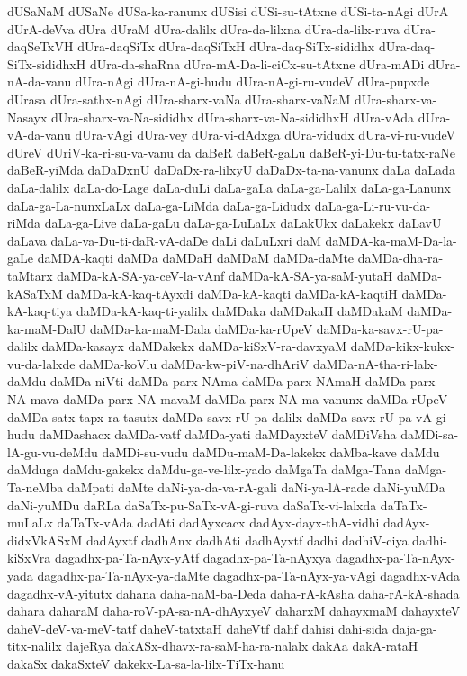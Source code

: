 {dUSaNaM
dUSaNe
dUSa-ka-ranunx
dUSisi
dUSi-su-tAtxne
dUSi-ta-nAgi
dUrA
dUrA-deVva
dUra
dUraM
dUra-dalilx
dUra-da-lilxna
dUra-da-lilx-ruva
dUra-daqSeTxVH
dUra-daqSiTx
dUra-daqSiTxH
dUra-daq-SiTx-sididhx
dUra-daq-SiTx-sididhxH
dUra-da-shaRna
dUra-mA-Da-li-ciCx-su-tAtxne
dUra-mADi
dUra-nA-da-vanu
dUra-nAgi
dUra-nA-gi-hudu
dUra-nA-gi-ru-vudeV
dUra-pupxde
dUrasa
dUra-sathx-nAgi
dUra-sharx-vaNa
dUra-sharx-vaNaM
dUra-sharx-va-Nasayx
dUra-sharx-va-Na-sididhx
dUra-sharx-va-Na-sididhxH
dUra-vAda
dUra-vA-da-vanu
dUra-vAgi
dUra-vey
dUra-vi-dAdxga
dUra-vidudx
dUra-vi-ru-vudeV
dUreV
dUriV-ka-ri-su-va-vanu
da
daBeR
daBeR-gaLu
daBeR-yi-Du-tu-tatx-raNe
daBeR-yiMda
daDaDxnU
daDaDx-ra-lilxyU
daDaDx-ta-na-vanunx
daLa
daLada
daLa-dalilx
daLa-do-Lage
daLa-duLi
daLa-gaLa
daLa-ga-Lalilx
daLa-ga-Lanunx
daLa-ga-La-nunxLaLx
daLa-ga-LiMda
daLa-ga-Lidudx
daLa-ga-Li-ru-vu-da-riMda
daLa-ga-Live
daLa-gaLu
daLa-ga-LuLaLx
daLakUkx
daLakekx
daLavU
daLava
daLa-va-Du-ti-daR-vA-daDe
daLi
daLuLxri
daM
daMDA-ka-maM-Da-la-gaLe
daMDA-kaqti
daMDa
daMDaH
daMDaM
daMDa-daMte
daMDa-dha-ra-taMtarx
daMDa-kA-SA-ya-ceV-la-vAnf
daMDa-kA-SA-ya-saM-yutaH
daMDa-kASaTxM
daMDa-kA-kaq-tAyxdi
daMDa-kA-kaqti
daMDa-kA-kaqtiH
daMDa-kA-kaq-tiya
daMDa-kA-kaq-ti-yalilx
daMDaka
daMDakaH
daMDakaM
daMDa-ka-maM-DalU
daMDa-ka-maM-Dala
daMDa-ka-rUpeV
daMDa-ka-savx-rU-pa-dalilx
daMDa-kasayx
daMDakekx
daMDa-kiSxV-ra-davxyaM
daMDa-kikx-kukx-vu-da-lalxde
daMDa-koVlu
daMDa-kw-piV-na-dhAriV
daMDa-nA-tha-ri-lalx-daMdu
daMDa-niVti
daMDa-parx-NAma
daMDa-parx-NAmaH
daMDa-parx-NA-mava
daMDa-parx-NA-mavaM
daMDa-parx-NA-ma-vanunx
daMDa-rUpeV
daMDa-satx-tapx-ra-tasutx
daMDa-savx-rU-pa-dalilx
daMDa-savx-rU-pa-vA-gi-hudu
daMDashacx
daMDa-vatf
daMDa-yati
daMDayxteV
daMDiVsha
daMDi-sa-lA-gu-vu-deMdu
daMDi-su-vudu
daMDu-maM-Da-lakekx
daMba-kave
daMdu
daMduga
daMdu-gakekx
daMdu-ga-ve-lilx-yado
daMgaTa
daMga-Tana
daMga-Ta-neMba
daMpati
daMte
daNi-ya-da-va-rA-gali
daNi-ya-lA-rade
daNi-yuMDa
daNi-yuMDu
daRLa
daSaTx-pu-SaTx-vA-gi-ruva
daSaTx-vi-lalxda
daTaTx-muLaLx
daTaTx-vAda
dadAti
dadAyxcacx
dadAyx-dayx-thA-vidhi
dadAyx-didxVkASxM
dadAyxtf
dadhAnx
dadhAti
dadhAyxtf
dadhi
dadhiV-ciya
dadhi-kiSxVra
dagadhx-pa-Ta-nAyx-yAtf
dagadhx-pa-Ta-nAyxya
dagadhx-pa-Ta-nAyx-yada
dagadhx-pa-Ta-nAyx-ya-daMte
dagadhx-pa-Ta-nAyx-ya-vAgi
dagadhx-vAda
dagadhx-vA-yitutx
dahana
daha-naM-ba-Deda
daha-rA-kAsha
daha-rA-kA-shada
dahara
daharaM
daha-roV-pA-sa-nA-dhAyxyeV
daharxM
dahayxmaM
dahayxteV
daheV-deV-va-meV-tatf
daheV-tatxtaH
daheVtf
dahf
dahisi
dahi-sida
daja-ga-titx-nalilx
dajeRya
dakASx-dhavx-ra-saM-ha-ra-nalalx
dakAa
dakA-rataH
dakaSx
dakaSxteV
dakekx-La-sa-la-lilx-TiTx-hanu
}
